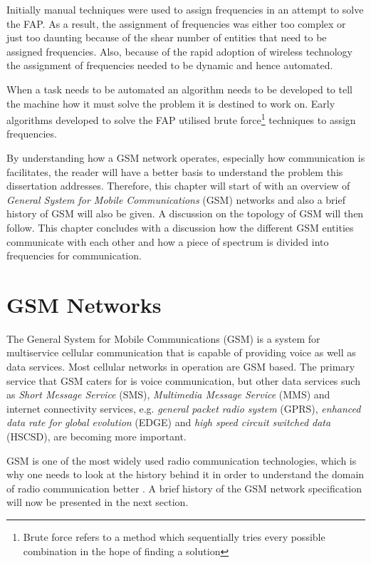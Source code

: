 Initially manual techniques were used to assign frequencies in an attempt to solve the FAP\cite{Karen2004}. As a result, the assignment of frequencies was either too complex or just too daunting because of the shear number of entities that need to be assigned frequencies\cite{Karen2004}. Also, because of the rapid adoption of wireless technology the assignment of frequencies needed to be dynamic and hence automated\cite{Karen2004}.

When a task needs to be automated an algorithm needs to be developed to tell the machine how it must solve the problem it is destined to work on. Early algorithms developed to solve the FAP utilised brute force\footnote{Brute force refers to a method which sequentially tries every possible combination in the hope of finding a solution} techniques to assign frequencies\cite{Karen2004,Eisenblatter}.

By understanding how a GSM network operates, especially how communication is facilitates, the reader will have a better basis to understand the problem this dissertation addresses. Therefore, this chapter will start of with an overview of \emph{General System for Mobile Communications} (GSM) networks and also a brief history of GSM will also be given. A discussion on the topology of GSM will then follow. This chapter concludes with a discussion how the different GSM entities communicate with each other and how a piece of spectrum is divided into frequencies for communication.

\section{GSM Networks}
The General System for Mobile Communications (GSM) is a system for multiservice cellular communication that is capable of providing voice as well as data services\cite{GSMArchitectureProtocolsServices,wirelesstelcoMullet}. Most cellular networks in operation are GSM based\cite{Karen2004,wirelesstelcoMullet}. The primary service that GSM caters for is voice communication, but other data services such as \emph{Short Message Service} (SMS), \emph{Multimedia Message Service} (MMS) and internet connectivity services, e.g. \emph{general packet radio system} (GPRS), \emph{enhanced data rate for global evolution} (EDGE) and \emph{high speed circuit switched data} (HSCSD), are becoming more important\cite{GSMArchitectureProtocolsServices,Eisenblatter}.

GSM is one of the most widely used radio communication technologies, which is why one needs to look at the history behind it in order to understand the domain of radio communication better \cite{GSMArchitectureProtocolsServices}. A brief history of the GSM network specification will now be presented in the next section.

